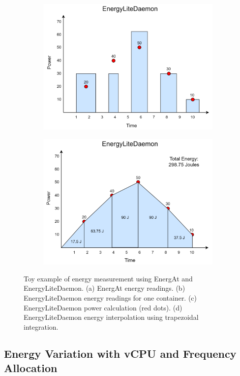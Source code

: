 \documentclass[times, 10pt,twocolumn]{article}
\begin{document}
\begin{figure}[ht]
\begin{subfigure}[b]{0.24\textwidth}
         \centering
         \includegraphics[width=\textwidth]{imgs/EnergyLiteDaemon_Energy_2.png}
         \caption{}
         \label{fig:c}
   \end{subfigure}
   \hfill
   \begin{subfigure}[b]{0.24\textwidth} %
         \centering
         \includegraphics[width=\textwidth]{imgs/EnergyLiteDaemon_Energy_3.png}
         \caption{}
         \label{fig:d}
   \end{subfigure}
   
   \caption{Toy example of energy measurement using EnergAt and EnergyLiteDaemon. (a) EnergAt energy readings. (b) EnergyLiteDaemon energy readings for one container. (c) EnergyLiteDaemon power calculation (red dots). (d) EnergyLiteDaemon energy interpolation using trapezoidal integration.}
   \label{fig:energy_toy_example}
\end{figure}

\subsection{Energy Variation with vCPU and Frequency Allocation}
\label{appendix:energy_variation_vcpu_frequency}
\end{document}
